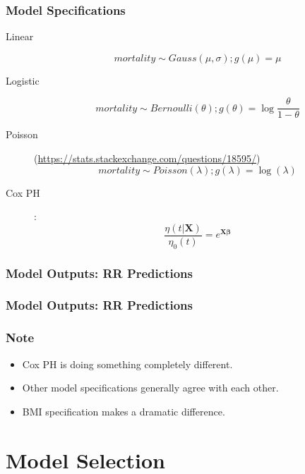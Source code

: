 \documentclass{philslides}
\begin{document}
{
	\frametitle{Model Specifications}
	\begin{description}
	\item[Linear] 
		\[mortality \sim Gauss(\mu, \sigma); g(\mu) = \mu\]
	\item[Logistic] 
		\[mortality \sim Bernoulli(\theta); g(\theta) = \log \frac{\theta}{1-\theta}\]
	\item[Poisson] 
		{\tiny (\url{https://stats.stackexchange.com/questions/18595/})}
		\[mortality \sim Poisson(\lambda); g(\lambda) = \log(\lambda)\]
	\item[Cox PH] : 
		\[\frac{\eta(t | \mathbf{X})}{\eta_0(t)} = e^{\mathbf{X\beta}} \]
	\end{description}
}
\frame
{
	\frametitle{Model Outputs: RR Predictions}
}
\frame
{
	\frametitle{Model Outputs: RR Predictions}
}
\frame
{
	\frametitle{Note}
	\begin{itemize}
	\item Cox PH is doing something completely different.  
	\item Other model specifications generally agree with each other.  
	\item BMI specification makes a dramatic difference.  
	\end{itemize}
}



\section{Model Selection}
\end{document}
